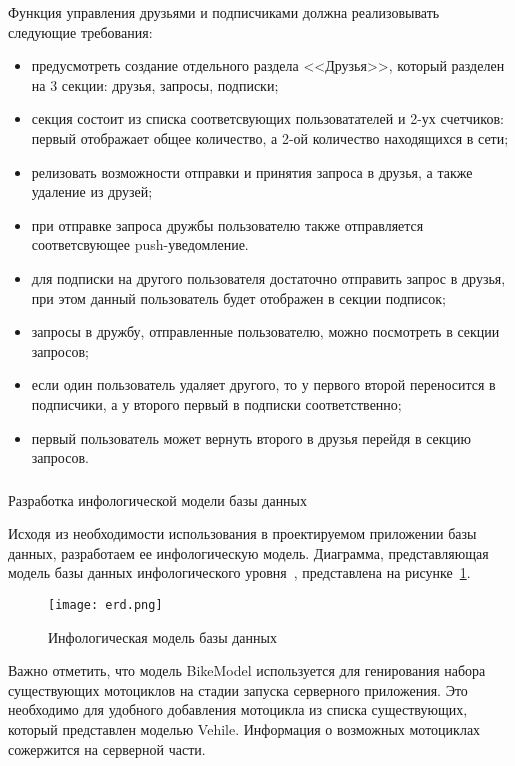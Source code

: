 Функция управления друзьями и подписчиками должна реализовывать следующие требования:
\begin{itemize}
	\item предусмотреть создание отдельного раздела <<Друзья>>, который разделен на 3 секции: друзья, запросы, подписки;
	\item секция состоит из списка соответсвующих пользоватателей и 2-ух счетчиков: первый отображает общее количество, а 2-ой количество находящихся в сети;
	\item релизовать возможности отправки и принятия запроса в друзья, а также удаление из друзей;
	\item при отправке запроса дружбы пользователю также отправляется соответсвующее push-уведомление.
	\item для подписки на другого пользователя достаточно отправить запрос в друзья, при этом данный пользователь будет отображен в секции подписок;
	\item запросы в дружбу, отправленные пользователю, можно посмотреть в секции запросов;
	\item если один пользователь удаляет другого, то у первого второй переносится в подписчики, а у второго первый в подписки соответственно;
	\item первый пользователь может вернуть второго в друзья перейдя в секцию запросов.
\end{itemize}

\subsubsection{} Разработка инфологической модели базы данных
\label{sec:domain:model:db}

Исходя из необходимости использования в проектируемом приложении базы данных, разработаем ее инфологическую модель. Диаграмма, представляющая модель базы данных инфологического уровня~\cite{kulikov_db_workbook}, представлена на рисунке~\ref{fig:domain:model:db:model}.

\begin{figure}[H]
\centering
	\texttt{[image: erd.png]}
	\caption{Инфологическая модель базы данных}
	\label{fig:domain:model:db:model}
\end{figure}

Важно отметить, что модель BikeModel используется для генирования набора существующих мотоциклов на стадии запуска серверного приложения. Это необходимо для удобного добавления мотоцикла из списка существующих, который представлен моделью Vehile. Информация о возможных мотоциклах сожержится на серверной части.

